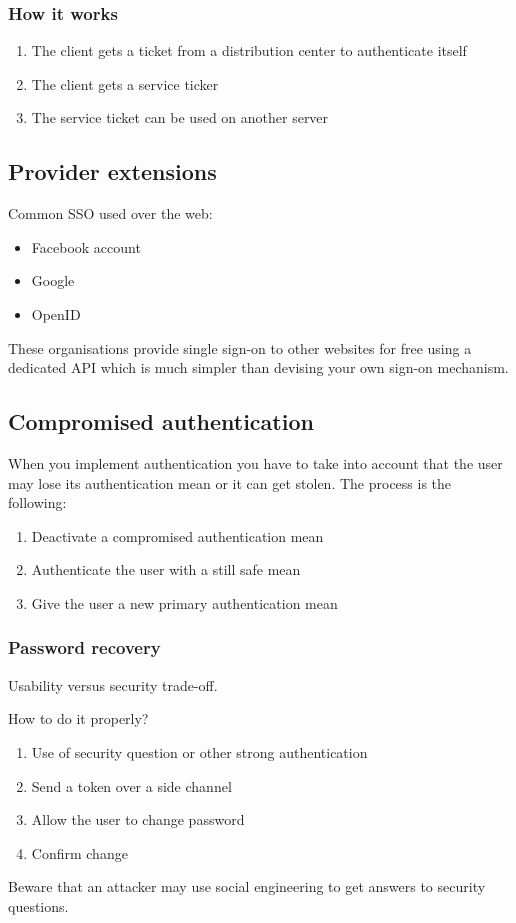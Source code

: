 \subsubsection*{How it works}
\begin{enumerate}
\item The client gets a ticket from a distribution center to authenticate itself
\item The client gets a service ticker
\item The service ticket can be used on another server
\end{enumerate}
\subsection{Provider extensions}
Common SSO used over the web:
\begin{itemize}
\item Facebook account
\item Google
\item OpenID
\end{itemize}
These organisations provide single sign-on to other websites for free
using a dedicated API which is much simpler than devising your own
sign-on mechanism.
\subsection{Compromised authentication}
When you implement authentication you have to take into account that the user may lose its authentication mean or it can get stolen.
The process is the following:
\begin{enumerate}
\item Deactivate a compromised authentication mean
\item Authenticate the user with a still safe mean
\item Give the user a new primary authentication mean
\end{enumerate}
\subsubsection{Password recovery}
Usability versus security trade-off.

How to do it properly?
\begin{enumerate}
\item Use of security question or other strong authentication
\item Send a token over a side channel
\item Allow the user to change password
\item Confirm change
\end{enumerate}
Beware that an attacker may use social engineering to get answers to security questions.
